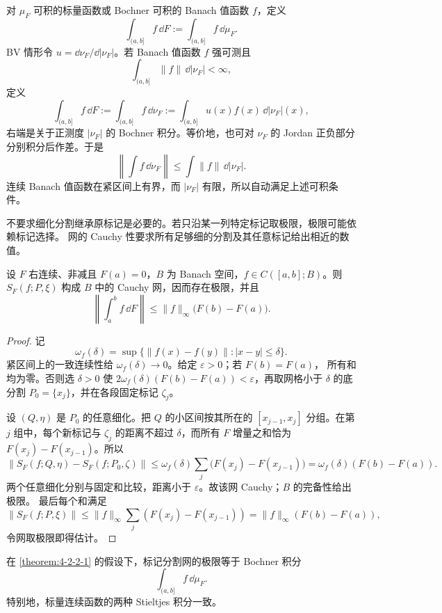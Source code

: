 \begin{definition}\label{def:4-2-2-3}
对 $\mu_F$ 可积的标量函数或 Bochner 可积的 Banach 值函数 $f$，定义
\[
 \int_{(a,b]}f\,\dd F:=\int_{(a,b]}f\,\dd\mu_F.
\]
BV 情形令 $u=\dd\nu_F/\dd|\nu_F|$。若 Banach 值函数 $f$ 强可测且
\[
 \int_{(a,b]}\|f\|\,\dd|\nu_F|<\infty,
\]
定义
\[
 \int_{(a,b]}f\,\dd F
 :=\int_{(a,b]}f\,\dd\nu_F
 :=\int_{(a,b]}u(x)f(x)\,\dd|\nu_F|(x),
\]
右端是关于正测度 $|\nu_F|$ 的 Bochner 积分。等价地，也可对 $\nu_F$ 的 Jordan 正负部分
分别积分后作差。于是
\[
 \left\|\int f\,\dd\nu_F\right\|
 \leq\int\|f\|\,\dd|\nu_F|.
\]
连续 Banach 值函数在紧区间上有界，而 $|\nu_F|$ 有限，所以自动满足上述可积条件。
\end{definition}

不要求细化分割继承原标记是必要的。若只沿某一列特定标记取极限，极限可能依赖标记选择。
网的 Cauchy 性要求所有足够细的分割及其任意标记给出相近的数值。

\begin{theorem}[分割和收敛]\label{theorem:4-2-2-1}
设 $F$ 右连续、非减且 $F(a)=0$，$B$ 为 Banach 空间，$f\in C([a,b];B)$。则
$S_F(f;P,\xi)$ 构成 $B$ 中的 Cauchy 网，因而存在极限，并且
\[
 \left\|\int_a^bf\,\dd F\right\|
 \le\|f\|_\infty\bigl(F(b)-F(a)\bigr).
\]
\end{theorem}

\begin{proof}
记
\[
 \omega_f(\delta)=\sup\{\|f(x)-f(y)\|:|x-y|\le\delta\}.
\]
紧区间上的一致连续性给 $\omega_f(\delta)\to0$。给定 $\varepsilon>0$；若 $F(b)=F(a)$，
所有和均为零。否则选 $\delta>0$ 使
$2\omega_f(\delta)(F(b)-F(a))<\varepsilon$，再取网格小于 $\delta$ 的底分割
$P_0=\{x_j\}$，并在各段固定标记 $\zeta_j$。

设 $(Q,\eta)$ 是 $P_0$ 的任意细化。把 $Q$ 的小区间按其所在的
$[x_{j-1},x_j]$ 分组。在第 $j$ 组中，每个新标记与 $\zeta_j$ 的距离不超过 $\delta$，而所有
$F$ 增量之和恰为 $F(x_j)-F(x_{j-1})$。所以
\[
 \left\|S_F(f;Q,\eta)-S_F(f;P_0,\zeta)\right\|
 \le\omega_f(\delta)\sum_j\bigl(F(x_j)-F(x_{j-1})\bigr)
 =\omega_f(\delta)(F(b)-F(a)).
\]
两个任意细化分别与固定和比较，距离小于 $\varepsilon$。故该网 Cauchy；$B$ 的完备性给出极限。
最后每个和满足
\[
 \|S_F(f;P,\xi)\|
 \le\|f\|_\infty\sum_j(F(x_j)-F(x_{j-1}))
 =\|f\|_\infty(F(b)-F(a)),
\]
令网取极限即得估计。
\end{proof}

\begin{theorem}\label{theorem:4-2-2-2}
在 \cref{theorem:4-2-2-1} 的假设下，标记分割网的极限等于 Bochner 积分
\[
 \int_{(a,b]} f\,\dd\mu_F.
\]
特别地，标量连续函数的两种 Stieltjes 积分一致。
\end{theorem}

